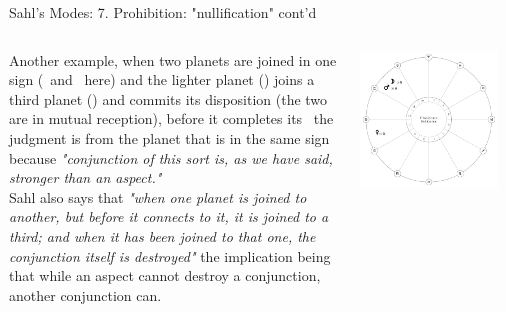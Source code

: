 \begin{frame}[t]{Sahl's Modes: 7. Prohibition: "nullification" cont'd}
\begin{columns}[T, onlytextwidth]
Another example, when two planets are joined in one sign (\Moon\ and \Mars\ here) and the lighter planet (\Moon) joins a third planet (\Venus) and commits its disposition (the two are in mutual reception), before it completes its \Conjunction\, the judgment is from the planet that is in the same sign because \textsl{"conjunction of this sort is, as we have said, stronger than an aspect."} \\

\vspace{0.25cm}
Sahl also says that \textsl{"when one planet is joined to another, but before it connects to it, it is joined to a third; and when it has been joined to that one, the conjunction itself is destroyed"} the implication being that while an aspect cannot destroy a conjunction, another conjunction can.

\begin{center}
{\includegraphics[width=0.9\textwidth]{charts/64a-nullification}} \\
\end{center}
\end{columns}
\end{frame}
